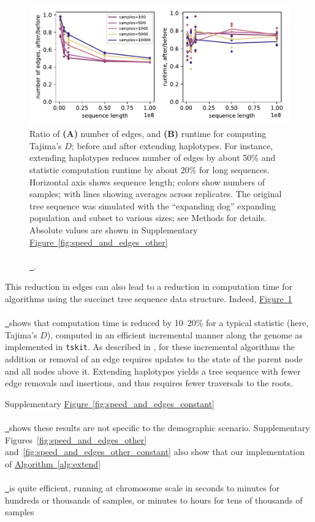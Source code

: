 \documentclass[10pt,twoside,lineno]{gsajnl}
\newcommand{\tskit}{\texttt{tskit}}
\newcommand{\algorithmref}[2][]{%
	\hyperref[{#2}]{%
		Algorithm~\ref*{#2}%
		\ifx\\#1\\%
		\else
		\,#1%
		\fi
	}%
}
\newcommand*{\figref}[2][]{%
	\hyperref[{#2}]{%
		Figure~\ref*{#2}%
		\ifx\\#1\\%
		\else
		\,#1%
		\fi
	}%
}
\begin{document}
\begin{figure}
    \centering
    \includegraphics{benchmarks/one_pop_results_ratios}
    \caption{
        Ratio of
        \textbf{(A)} number of edges, and
        \textbf{(B)} runtime for computing Tajima's $D$;
        before and after extending haplotypes.
        For instance, extending haplotypes reduces number of edges by about 50\%
        and statistic computation runtime by about 20\%
        for long sequences.
        Horizontal axis shows sequence length;
        colors show numbers of samples;
        with lines showing averages across replicates.
        The original tree sequence was simulated with the ``expanding dog'' expanding population
        and subset to various sizes;
        see Methods for details. 
        Absolute values are shown in Supplementary \figref{fig:speed_and_edges_other}.
        \label{fig:speed_and_edges}
    }
\end{figure}

This reduction in edges can also lead to a reduction in computation time for
algorithms using the succinct tree sequence data structure.
Indeed, \figref{fig:speed_and_edges} shows that computation time is reduced by 10--20\%
for a typical statistic (here, Tajima's $D$),
computed in an efficient incremental manner along the genome as implemented in \tskit.
As described in \citet{ralph2020efficiently}, for these incremental algorithms
the addition or removal of an edge requires updates
to the state of the parent node and all nodes above it.
Extending haplotypes yields a tree sequence with fewer edge removals and insertions, 
and thus requires fewer traversals to the roots.

Supplementary \figref{fig:speed_and_edges_constant} shows these results are not specific
to the demographic scenario.
Supplementary Figures~\ref{fig:speed_and_edges_other}
and~\ref{fig:speed_and_edges_other_constant}
also show that our implementation of \algorithmref{alg:extend} is quite efficient,
running at chromosome scale in seconds to minutes for hundreds or thousands of samples,
or minutes to hours for tens of thousands of samples
\end{document}
